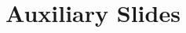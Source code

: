 \documentclass{beamer}
\begin{document}
%    



\appendix
\section{Auxiliary Slides}


\end{document}
